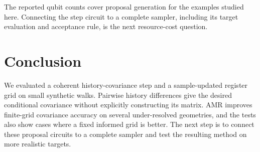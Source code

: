 \documentclass[twocolumn,reprint,aps,prd,floatfix,amsmath,amssymb]{revtex4-2}
\begin{document}
The reported qubit counts cover proposal generation for the examples studied here. Connecting the step circuit to a complete sampler, including its target evaluation and acceptance rule, is the next resource-cost question.

\section{Conclusion}

We evaluated a coherent history-covariance step and a sample-updated register grid on small synthetic walks. Pairwise history differences give the desired conditional covariance without explicitly constructing its matrix. AMR improves finite-grid covariance accuracy on several under-resolved geometries, and the tests also show cases where a fixed informed grid is better. The next step is to connect these proposal circuits to a complete sampler and test the resulting method on more realistic targets.



\end{document}
